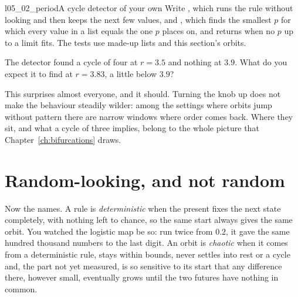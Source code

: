 \begin{lab}{l05_02_period}{A cycle detector of your own}
Write , which runs the rule without looking and then keeps the
next few values, and , which finds the smallest $p$ for which
every value in a list equals the one $p$ places on, and returns 
when no $p$ up to a limit fits. The tests use made-up lists and this
section's orbits.
\end{lab}

\begin{think}
The detector found a cycle of four at $r = \num{3.5}$ and nothing at
$\num{3.9}$. What do you expect it to find at $r = \num{3.83}$, a little
below $\num{3.9}$?
\end{think}


\noindent
This surprises almost everyone, and it should. Turning the knob up does not
make the behaviour steadily wilder: among the settings where orbits jump
without pattern there are narrow windows where order comes back. Where they
sit, and what a cycle of three implies, belong to the whole picture that
Chapter~\ref{ch:bifurcations} draws.

\section{Random-looking, and not random}
\label{sec:ch05-may}

\noindent
Now the names. A rule is \emph{deterministic} when the present fixes the next
state completely, with nothing left to chance, so the same start always gives
the same orbit. You watched the logistic map be so: run twice from
$\num{0.2}$, it gave the same hundred thousand numbers to the last digit. An
orbit is \emph{chaotic} when it comes from a deterministic rule, stays within
bounds, never settles into rest or a cycle \dash{} and, the part not yet
measured, is so sensitive to its start that any difference there, however
small, eventually grows until the two futures have nothing in common.


